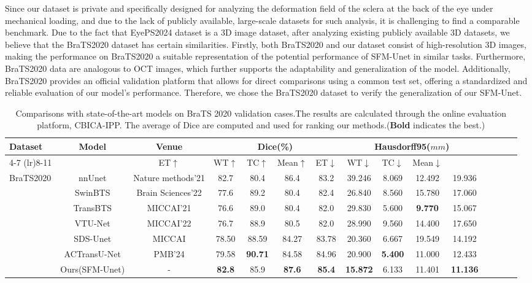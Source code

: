 \documentclass[AMA,Times1COL]{WileyNJDv5} %
\begin{document}
Since our dataset is private and specifically designed for analyzing the deformation field of the sclera at the back of the eye under mechanical loading, and due to the lack of publicly available, large-scale datasets for such analysis, it is challenging to find a comparable benchmark. Due to the fact that EyePS2024 dataset is a 3D image dataset, after analyzing existing publicly available 3D datasets, we believe that the BraTS2020 dataset has certain similarities. Firstly, both BraTS2020 and our dataset consist of high-resolution 3D images, making the performance on BraTS2020 a suitable representation of the potential performance of SFM-Unet in similar tasks. Furthermore, BraTS2020 data are analogous to OCT images, which further supports the adaptability and generalization of the model. Additionally, BraTS2020 provides an official validation platform that allows for direct comparisons using a common test set, offering a standardized and reliable evaluation of our model's performance. Therefore, we chose the BraTS2020 dataset to verify the generalization of our SFM-Unet.

\begin{table}[htbp]
\centering
\scriptsize
\caption{Comparisons with state-of-the-art models on BraTS 2020 validation cases.The results are calculated through the online evaluation platform, CBICA-IPP. The average of Dice are computed and used for ranking our methods.(\textbf{Bold} indicates the best.)}
\begin{tabular}{lcccccccccccccc}
\toprule
\multirow{2}{*}{Dataset} & \multirow{2}{*}{Model}& \multirow{2}{*}{Venue} & \multicolumn{4}{c}{Dice(\%)} & \multicolumn{4}{c}{Hausdorff95($mm$)} \\ 
\cmidrule(lr){4-7} \cmidrule(lr){8-11}
 & & ET$\uparrow$ & WT$\uparrow$ & TC$\uparrow$ & Mean$\uparrow$ & ET$\downarrow$ & WT$\downarrow$ & TC$\downarrow$ & Mean$\downarrow$ \\ 
\midrule
BraTS2020 & nnUnet\cite{isensee2018nnu}&Nature methods'21 & 82.7 & 80.4 & 86.4 & 83.2 & 39.246 & 8.069 & 12.492 & 19.936 \\ 
 & SwinBTS\cite{jiang2022swinbts}&Brain Sciences'22 & 77.6 & 89.2 & 80.4 & 82.4 & 26.840 & 8.560 & 15.780 & 17.060 \\ 
 & TransBTS\cite{wenxuan2021transbts}&MICCAI'21 & 76.6 & 89.0 & 80.4 & 82.0 & 29.830 & 5.600 & \textbf{9.770} & 15.067 \\ 
 & VTU-Net\cite{peiris2022VTU}&MICCAI'22 & 76.7 & 88.9 & 80.5 & 82.0 & 28.990 & 9.560 & 14.400 & 17.650 \\ 
 & SDS-Unet\cite{henry2021brain}&MICCAI &  78.50 & 88.59 & 84.27 & 83.78 & 20.360 & 6.667 & 19.549 & 14.192 \\ 
 & ACTransU-Net\cite{chen2024adaptive}&PMB'24 &  79.58 & \textbf{90.71} &  84.58 &  84.96 & 20.900 & \textbf{5.400} & 11.000 & 12.433 \\ 
 & Ours(SFM-Unet)&- & \textbf{82.8} & 85.9 & \textbf{87.6} & \textbf{85.4} & \textbf{15.872} & 6.133 & 11.401 & \textbf{11.136} \\ 
\bottomrule
\end{tabular}
\label{tab:sota}
\end{table}
\end{document}
